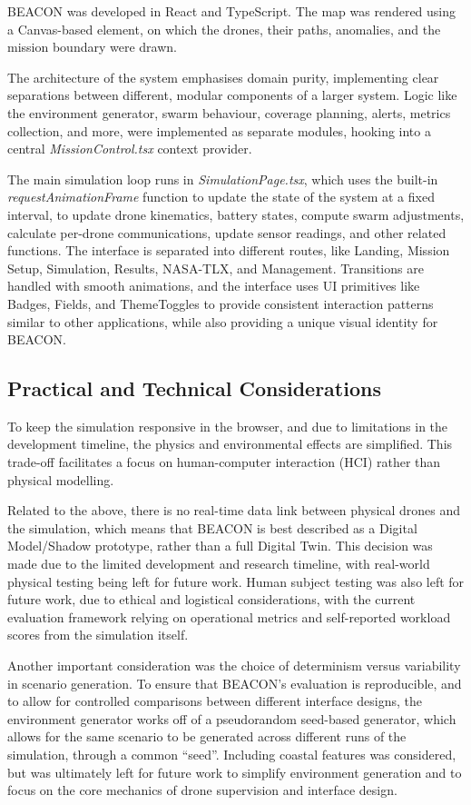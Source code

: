 BEACON was developed in React and TypeScript.
The map was rendered using a Canvas-based element, on which the drones, their paths, anomalies, and the mission boundary were drawn.

The architecture of the system emphasises domain purity, implementing clear separations between different, modular components of a larger system.
Logic like the environment generator, swarm behaviour, coverage planning, alerts, metrics collection, and more, were implemented as separate modules, hooking into a central \textit{MissionControl.tsx} context provider.

The main simulation loop runs in \textit{SimulationPage.tsx}, which uses the built-in \textit{requestAnimationFrame} function to update the state of the system at a fixed interval, to update drone kinematics, battery states, compute swarm adjustments, calculate per-drone communications, update sensor readings, and other related functions.
The interface is separated into different routes, like Landing, Mission Setup, Simulation, Results, NASA-TLX, and Management.
Transitions are handled with smooth animations, and the interface uses UI primitives like Badges, Fields, and ThemeToggles to provide consistent interaction patterns similar to other applications, while also providing a unique visual identity for BEACON\@.

\subsection{Practical and Technical Considerations}\label{subsec:practical-and-technical-considerations}

To keep the simulation responsive in the browser, and due to limitations in the development timeline, the physics and environmental effects are simplified.
This trade-off facilitates a focus on human-computer interaction (HCI) rather than physical modelling.

Related to the above, there is no real-time data link between physical drones and the simulation, which means that BEACON is best described as a Digital Model/Shadow prototype, rather than a full Digital Twin.
This decision was made due to the limited development and research timeline, with real-world physical testing being left for future work.
Human subject testing was also left for future work, due to ethical and logistical considerations, with the current evaluation framework relying on operational metrics and self-reported workload scores from the simulation itself.

Another important consideration was the choice of determinism versus variability in scenario generation.
To ensure that BEACON's evaluation is reproducible, and to allow for controlled comparisons between different interface designs, the environment generator works off of a pseudorandom seed-based generator, which allows for the same scenario to be generated across different runs of the simulation, through a common ``seed''.
Including coastal features was considered, but was ultimately left for future work to simplify environment generation and to focus on the core mechanics of drone supervision and interface design.

